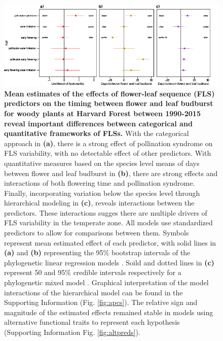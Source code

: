\documentclass[11pt]{article}
\begin{document}
\pagebreak  

 \begin{figure}[h!]
        \centering
         \includegraphics[width=\textwidth]{..//..//HFmodelplots.jpg}
          \caption{\textbf{Mean estimates of the effects of flower-leaf sequence (FLS) predictors on the timing between flower and leaf budburst for woody plants at Harvard Forest between 1990-2015 reveal important differences between categorical and quantitative frameworks of FLSs.}  With the categorical approach in \textbf{(a)}, there is a strong effect of  pollination syndrome on FLS variability, with no detectable effect of other predictors. With quantitative measures based on the species level means of days between flower and leaf budburst in \textbf{(b)}, there are strong effects and interactions of both flowering time and pollination syndrome. Finally, incorporating variation below the species level through hierarchical modeling in \textbf{(c)}, reveals interactions between the predictors. These interactions sugges there are multiple drivers of FLS variability in the temperate zone. All models use standardized predictors to allow for comparisons between them. Symbols represent mean estimated effect of each predictor, with solid lines in \textbf{(a)} and \textbf{(b)} representing the 95\% bootstrap intervals of the phylogenetic linear regression models \citep{Ives2010}. Soild and dotted lines in \textbf{(c)} represent 50 and 95\% credible intervals respectively for a phylogenetic mixed model \citep{Garamszegi2014}. Graphical interpretation of the model interactions of the hierarchical model can be found in the Supporting Information (Fig. \ref{fig:apcs}). The relative sign and magnitude of the estimated effects remained stable in models using alternative functional traits to represent each hypothesis (Supporting Information Fig. \ref{fig:altpreds}).}  
        \label{fig:muplotsHF}
    \end{figure}    


    
\end{document}
